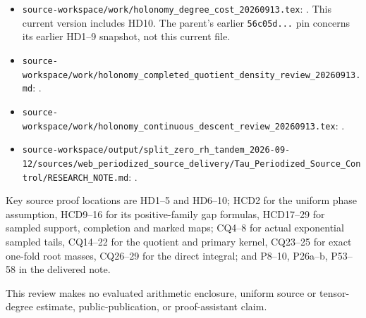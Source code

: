 \begin{itemize}
\tightlist
\item
  \nolinkurl{source-workspace/work/holonomy_degree_cost_20260913.tex}: \texttt{}. This current version includes HD10. The parent's earlier \texttt{56c05d...} pin concerns its earlier HD1--9 snapshot, not this current file.
\item
  \nolinkurl{source-workspace/work/holonomy_completed_quotient_density_review_20260913.md}: \texttt{}.
\item
  \nolinkurl{source-workspace/work/holonomy_continuous_descent_review_20260913.tex}: \texttt{}.
\item
  \nolinkurl{source-workspace/output/split_zero_rh_tandem_2026-09-12/sources/web_periodized_source_delivery/Tau_Periodized_Source_Control/RESEARCH_NOTE.md}: \texttt{}.
\end{itemize}

Key source proof locations are HD1--5 and HD6--10; HCD2 for the uniform phase assumption, HCD9--16 for its positive-family gap formulas, HCD17--29 for sampled support, completion and marked maps; CQ4--8 for actual exponential sampled tails, CQ14--22 for the quotient and primary kernel, CQ23--25 for exact one-fold root masses, CQ26--29 for the direct integral; and P8--10, P26a--b, P53--58 in the delivered note.

This review makes no evaluated arithmetic enclosure, uniform source or tensor-degree estimate, public-publication, or proof-assistant claim.


\endgroup
